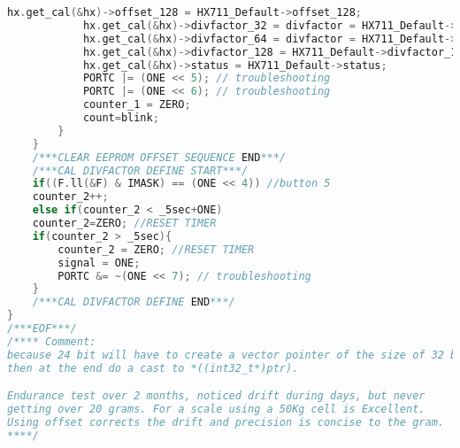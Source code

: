 \begin{lstlisting}[language=C, caption={main.c}, label=main-c, captionpos=b]
			hx.get_cal(&hx)->offset_128 = HX711_Default->offset_128;
			hx.get_cal(&hx)->divfactor_32 = divfactor = HX711_Default->divfactor_32;
			hx.get_cal(&hx)->divfactor_64 = divfactor = HX711_Default->divfactor_64;
			hx.get_cal(&hx)->divfactor_128 = HX711_Default->divfactor_128;
			hx.get_cal(&hx)->status = HX711_Default->status;
			PORTC |= (ONE << 5); // troubleshooting
			PORTC |= (ONE << 6); // troubleshooting
			counter_1 = ZERO;
			count=blink;
		}
	}
	/***CLEAR EEPROM OFFSET SEQUENCE END***/
	/***CAL DIVFACTOR DEFINE START***/
	if((F.ll(&F) & IMASK) == (ONE << 4)) //button 5
	counter_2++;
	else if(counter_2 < _5sec+ONE)
	counter_2=ZERO; //RESET TIMER
	if(counter_2 > _5sec){
		counter_2 = ZERO; //RESET TIMER
		signal = ONE;
		PORTC &= ~(ONE << 7); // troubleshooting
	}
	/***CAL DIVFACTOR DEFINE END***/
}
/***EOF***/
/**** Comment:
because 24 bit will have to create a vector pointer of the size of 32 bit,
then at the end do a cast to *((int32_t*)ptr).

Endurance test over 2 months, noticed drift during days, but never
getting over 20 grams. For a scale using a 50Kg cell is Excellent.
Using offset corrects the drift and precision is concise to the gram.
****/
\end{lstlisting}

